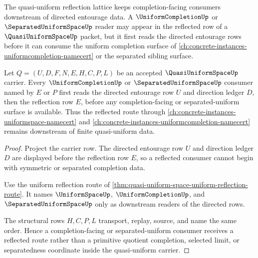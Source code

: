The quasi-uniform reflection lattice keeps completion-facing consumers downstream of directed entourage data. A $\UniformCompletionUp$ or $\SeparatedUniformSpaceUp$ reader may appear in the reflected row of a $\QuasiUniformSpaceUp$ packet, but it first reads the directed entourage rows before it can consume the uniform completion surface of \autoref{ch:concrete-instances-uniformcompletion-namecert} or the separated sibling surface.

\begin{theorem}
\label{thm:quasi-uniform-space-uniform-completion-reflection-lattice}
Let $Q=(U,D,F,N,E,H,C,P,L)$ be an accepted $\QuasiUniformSpaceUp$ carrier. Every $\UniformCompletionUp$ or $\SeparatedUniformSpaceUp$ consumer named by $E$ or $P$ first reads the directed entourage row $U$ and direction ledger $D$, then the reflection row $E$, before any completion-facing or separated-uniform surface is available. Thus the reflected route through \autoref{ch:concrete-instances-uniformspace-namecert} and \autoref{ch:concrete-instances-uniformcompletion-namecert} remains downstream of finite quasi-uniform data.
\end{theorem}
\begin{proof}
Project the carrier row. The directed entourage row $U$ and direction ledger $D$ are displayed before the reflection row $E$, so a reflected consumer cannot begin with symmetric or separated completion data.

Use the uniform reflection route of \autoref{thm:quasi-uniform-space-uniform-reflection-route}. It names $\UniformSpaceUp$, $\UniformCompletionUp$, and $\SeparatedUniformSpaceUp$ only as downstream readers of the directed rows.

The structural rows $H,C,P,L$ transport, replay, source, and name the same order. Hence a completion-facing or separated-uniform consumer receives a reflected route rather than a primitive quotient completion, selected limit, or separatedness coordinate inside the quasi-uniform carrier.
\end{proof}
